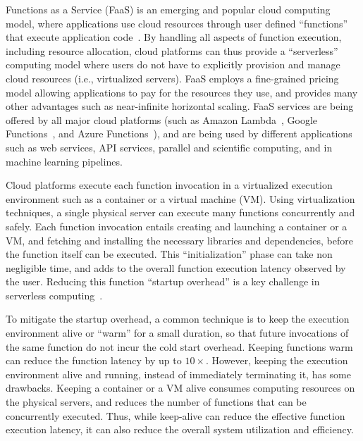 
Functions as a Service (FaaS) is an emerging and popular cloud computing model, where applications use cloud resources through user defined ``functions'' that execute application code~\cite{jonas_cloud_2019}.
%
By handling all aspects of function execution, including resource allocation, cloud platforms can thus provide a ``serverless'' computing model where users do not have to explicitly provision and manage cloud resources (i.e., virtualized servers).
%
FaaS employs a fine-grained pricing model allowing applications to pay for the resources they use, and provides many other advantages such as near-infinite horizontal scaling. 
%
FaaS services are being offered by all major cloud platforms (such as Amazon Lambda~\cite{aws-lambda}, Google Functions~\cite{google-functions}, and Azure Functions~\cite{azure-functions}), and are being used by different applications such as web services, API services,  parallel and scientific computing, and in machine learning pipelines. 


Cloud platforms execute each function invocation in a virtualized execution environment such as a container or a virtual machine (VM). %
%
Using virtualization techniques, a single physical server can execute many functions concurrently and safely. 
%
Each function invocation entails creating and launching a container or a VM, and fetching and installing the necessary libraries and dependencies, before the function itself can be executed.
%
This ``initialization'' phase can take non negligible time, and adds to the overall function execution latency observed by the user. 
%
Reducing this function ``startup overhead'' is a key challenge in serverless computing~\cite{oakes_sock_2018, hendrickson2016serverless, warm1, warm2}. 



To mitigate the startup overhead, a common technique is to keep the execution environment alive or ``warm'' for a small duration, so that future invocations of the same function do not incur the cold start overhead. 
%
Keeping functions warm can reduce the function latency by up to $10\times$. 
%
However, keeping the execution environment alive and running, instead of immediately terminating it, has some drawbacks. 
%
Keeping a container or a VM alive consumes computing resources on the physical servers, and reduces the  number of functions that can be concurrently executed. 
%
Thus, while keep-alive can reduce the effective function execution latency, it can also reduce the overall system utilization and efficiency. 
%


